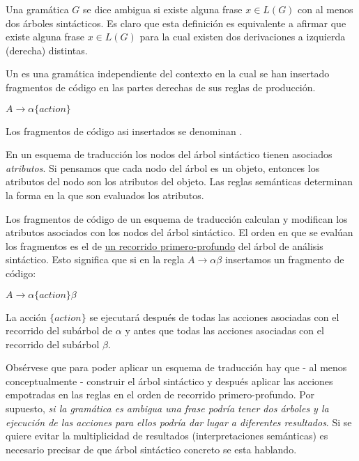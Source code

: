 \begin{definition}
Una gramática $G$ se dice ambigua si existe alguna frase $x \in L(G)$
con al menos dos árboles sintácticos. 
Es claro que esta definición es equivalente a afirmar que existe 
alguna frase $x \in L(G)$ para la cual existen dos derivaciones a 
izquierda (derecha) distintas.
\end{definition}

\begin{definition}
Un  es una gramática independiente del contexto
en la cual se han insertado fragmentos de código en las partes derechas
de sus reglas de producción. 

\begin{center}
$A \rightarrow \alpha \{ action \}$
\end{center}

Los fragmentos de código asi insertados
se denominan . 


En un esquema de traducción los nodos del árbol sintáctico tienen asociados
\emph{atributos}. Si pensamos que cada nodo del árbol es un objeto, entonces
los atributos del nodo son los atributos del objeto. Las reglas semánticas
determinan la forma en la que son evaluados los atributos.

Los fragmentos de código de un esquema de traducción calculan
y modifican los atributos asociados con los nodos del árbol sintáctico.
El orden en que se evalúan los fragmentos
es el de \underline{un recorrido primero-profundo} del árbol de análisis sintáctico.
Esto significa que si en la regla 
$A \rightarrow \alpha \beta $
insertamos un fragmento de código:

\begin{center}
$A \rightarrow \alpha \{ action \} \beta $
\end{center}

La acción $\{ action \}$ se ejecutará después de todas las acciones
asociadas con el recorrido del subárbol de $\alpha$ y antes que todas
las acciones asociadas con el recorrido del subárbol $\beta$.

Obsérvese que para poder aplicar un esquema de traducción hay
que - al menos conceptualmente - construir el árbol sintáctico y 
después aplicar las acciones empotradas
en las reglas en el orden de recorrido primero-profundo. Por supuesto, \emph{si
la gramática es ambigua una frase podría tener dos árboles y la ejecución de las
acciones para ellos podría dar lugar a diferentes resultados}. Si se quiere
evitar la multiplicidad de resultados (interpretaciones semánticas)
es necesario precisar de que árbol sintáctico concreto se esta hablando.

\end{definition}

